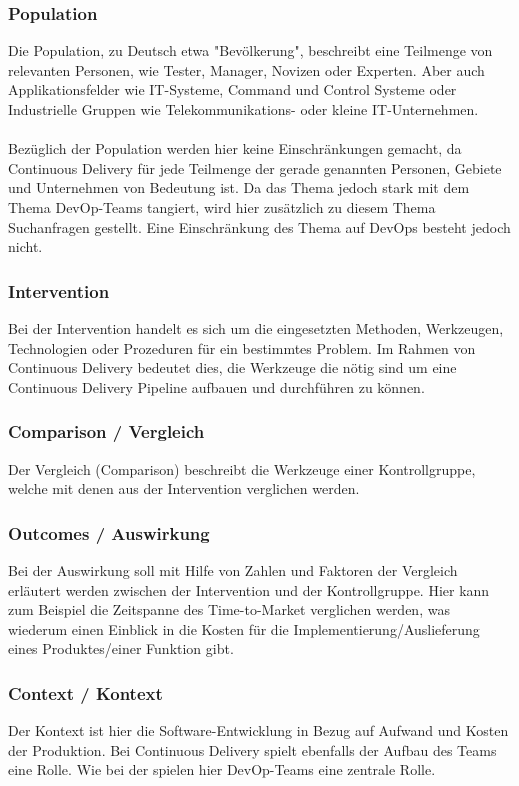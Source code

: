 \subsubsection*{Population}
\label{picoc:population}
Die Population, zu Deutsch etwa "Bevölkerung", beschreibt eine Teilmenge von relevanten Personen, wie Tester, Manager, Novizen oder Experten. Aber auch Applikationsfelder wie IT-Systeme, Command und Control Systeme oder Industrielle Gruppen wie Telekommunikations- oder kleine IT-Unternehmen.
\\\\
Bezüglich der Population werden hier keine Einschränkungen gemacht, da Continuous Delivery für jede Teilmenge der gerade genannten Personen, Gebiete und Unternehmen von Bedeutung ist. Da das Thema jedoch stark mit dem Thema DevOp-Teams tangiert, wird hier zusätzlich zu diesem Thema Suchanfragen gestellt. Eine Einschränkung des Thema auf DevOps besteht jedoch nicht.

\subsubsection*{Intervention}
\label{picoc:Interventation}
Bei der Intervention handelt es sich um die eingesetzten Methoden, Werkzeugen, Technologien oder Prozeduren für ein bestimmtes Problem. Im Rahmen von Continuous Delivery bedeutet dies, die Werkzeuge die nötig sind um eine Continuous Delivery Pipeline aufbauen und durchführen zu können.

\subsubsection*{Comparison / Vergleich}
\label{picoc:Comparison}
Der Vergleich (Comparison) beschreibt die Werkzeuge einer Kontrollgruppe, welche mit denen aus der Intervention verglichen werden.

\subsubsection*{Outcomes / Auswirkung}
\label{picoc:Outcomes}
Bei der Auswirkung soll mit Hilfe von Zahlen und Faktoren der Vergleich erläutert werden zwischen der Intervention und der Kontrollgruppe. Hier kann zum Beispiel die Zeitspanne des Time-to-Market verglichen werden, was wiederum einen Einblick in die Kosten für die Implementierung/Auslieferung eines Produktes/einer Funktion gibt.

\subsubsection*{Context / Kontext}
\label{picoc:Context}
Der Kontext ist hier die Software-Entwicklung in Bezug auf Aufwand und Kosten der Produktion. Bei Continuous Delivery spielt ebenfalls der Aufbau des Teams eine Rolle. Wie bei der  spielen hier DevOp-Teams eine zentrale Rolle.

